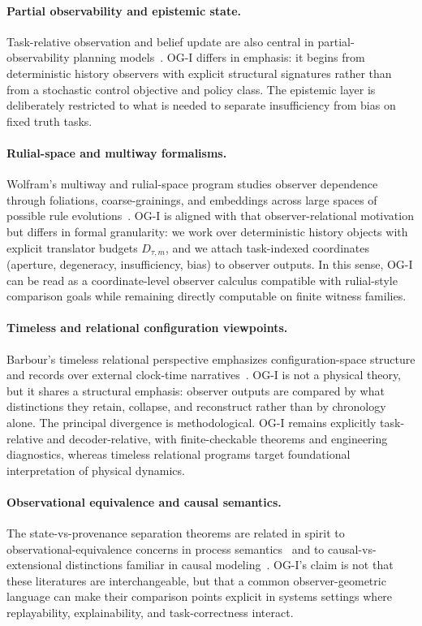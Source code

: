 \documentclass[11pt,twoside]{article}
\theoremstyle{definition}
\begin{document}
\paragraph{Partial observability and epistemic state.}
Task-relative observation and belief update are also central in partial-observability planning models~\cite{kaelbling1998pomdp}. OG-I differs in emphasis: it begins from deterministic history observers with explicit structural signatures rather than from a stochastic control objective and policy class. The epistemic layer is deliberately restricted to what is needed to separate insufficiency from bias on fixed truth tasks.

\paragraph{Rulial-space and multiway formalisms.}
Wolfram's multiway and rulial-space program studies observer dependence through foliations, coarse-grainings, and embeddings across large spaces of possible rule evolutions~\cite{Wol20}. OG-I is aligned with that observer-relational motivation but differs in formal granularity: we work over deterministic history objects with explicit translator budgets \(D_{\tau,m}\), and we attach task-indexed coordinates (aperture, degeneracy, insufficiency, bias) to observer outputs. In this sense, OG-I can be read as a coordinate-level observer calculus compatible with rulial-style comparison goals while remaining directly computable on finite witness families.

\paragraph{Timeless and relational configuration viewpoints.}
Barbour's timeless relational perspective emphasizes configuration-space structure and records over external clock-time narratives~\cite{Bar94}. OG-I is not a physical theory, but it shares a structural emphasis: observer outputs are compared by what distinctions they retain, collapse, and reconstruct rather than by chronology alone. The principal divergence is methodological. OG-I remains explicitly task-relative and decoder-relative, with finite-checkable theorems and engineering diagnostics, whereas timeless relational programs target foundational interpretation of physical dynamics.

\paragraph{Observational equivalence and causal semantics.}
The state-vs-provenance separation theorems are related in spirit to observational-equivalence concerns in process semantics~\cite{milner1989communication} and to causal-vs-extensional distinctions familiar in causal modeling~\cite{pearl2009causality}. OG-I's claim is not that these literatures are interchangeable, but that a common observer-geometric language can make their comparison points explicit in systems settings where replayability, explainability, and task-correctness interact.
\end{document}
